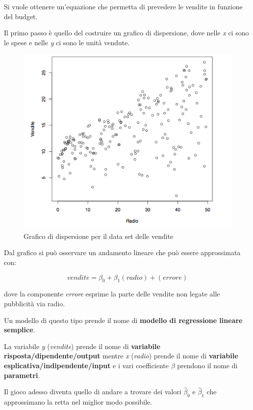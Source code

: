 Si vuole ottenere un'equazione che permetta di prevedere le vendite in
funzione del budget.

Il primo passo è quello del costruire un grafico di dispersione, dove
nelle \emph{x} ci sono le spese e nelle \emph{y} ci sono le unità
vendute.

\begin{figure}[htbp]
\centering
\includegraphics{./notes/immagini/l3-figura1.png}
\caption{Grafico di dispersione per il data set delle vendite}
\end{figure}

Dal grafico si può osservare un andamento lineare che può essere
approssimata con:

$$
vendite = \beta_0 + \beta_1 (radio) + (errore)
$$

dove la componente \emph{errore} esprime la parte delle vendite non
legate alle pubblicità via radio.

Un modello di questo tipo prende il nome di \textbf{modello di
regressione lineare semplice}.

La variabile \emph{y} (\emph{vendite}) prende il nome di
\textbf{variabile risposta/dipendente/output} mentre \emph{x}
(\emph{radio}) prende il nome di \textbf{variabile
esplicativa/indipendente/input} e i vari coefficiente $\beta$
prendono il nome di \textbf{parametri}.

Il gioco adesso diventa quello di andare a trovare dei valori
$\hat{\beta}_0$ e $\hat{\beta}_1$ che approssimano la retta nel miglior modo
possibile.

